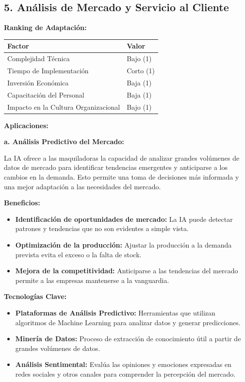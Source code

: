 \documentclass[
  10pt,
  letterpaper,
]{book}
\providecommand{\tightlist}{%
  \setlength{\itemsep}{0pt}\setlength{\parskip}{0pt}}\usepackage{longtable,booktabs,array}
\begin{document}
\subsection{5. Análisis de Mercado y Servicio al
Cliente}\label{anuxe1lisis-de-mercado-y-servicio-al-cliente}

\textbf{Ranking de Adaptación:}

\begin{longtable}[]{@{}ll@{}}
\toprule\noalign{}
Factor & Valor \\
\midrule\noalign{}
\endhead
\bottomrule\noalign{}
\endlastfoot
Complejidad Técnica & Bajo (1) \\
Tiempo de Implementación & Corto (1) \\
Inversión Económica & Baja (1) \\
Capacitación del Personal & Baja (1) \\
Impacto en la Cultura Organizacional & Bajo (1) \\
\end{longtable}

\textbf{Aplicaciones:}

\textbf{a. Análisis Predictivo del Mercado:}

La IA ofrece a las maquiladoras la capacidad de analizar grandes
volúmenes de datos de mercado para identificar tendencias emergentes y
anticiparse a los cambios en la demanda. Esto permite una toma de
decisiones más informada y una mejor adaptación a las necesidades del
mercado.

\textbf{Beneficios:}

\begin{itemize}
\tightlist
\item
  \textbf{Identificación de oportunidades de mercado:} La IA puede
  detectar patrones y tendencias que no son evidentes a simple vista.
\item
  \textbf{Optimización de la producción:} Ajustar la producción a la
  demanda prevista evita el exceso o la falta de stock.
\item
  \textbf{Mejora de la competitividad:} Anticiparse a las tendencias del
  mercado permite a las empresas mantenerse a la vanguardia.
\end{itemize}

\textbf{Tecnologías Clave:}

\begin{itemize}
\tightlist
\item
  \textbf{Plataformas de Análisis Predictivo:} Herramientas que utilizan
  algoritmos de Machine Learning para analizar datos y generar
  predicciones.
\item
  \textbf{Minería de Datos:} Proceso de extracción de conocimiento útil
  a partir de grandes volúmenes de datos.
\item
  \textbf{Análisis Sentimental:} Evalúa las opiniones y emociones
  expresadas en redes sociales y otros canales para comprender la
  percepción del mercado.
\end{itemize}
\end{document}
